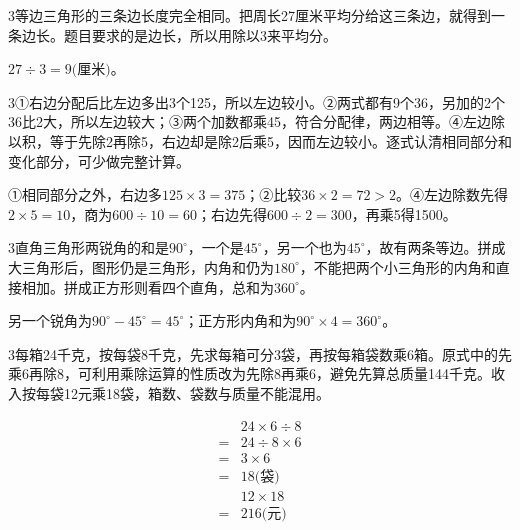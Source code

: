 \documentclass[multi=snippet,border={5bp 20bp 5bp 5bp}]{standalone}
\newenvironment{snippet}[3]{\begin{minipage}{#1bp}\color{answerred}\fontsize{#2}{#3}\selectfont\raggedright}{\end{minipage}}
\begin{document}
\begin{snippet}{505}{11.5}{14}\begin{multicols}{3}\raggedcolumns 等边三角形的三条边长度完全相同。把周长27厘米平均分给这三条边，就得到一条边长。题目要求的是边长，所以用除以3来平均分。\par \(27\div3=9\text{(厘米)}\)\allowbreak 。\end{multicols}\end{snippet}
\begin{snippet}{505}{11.5}{14}\begin{multicols}{3}\raggedcolumns ①右边分配后比左边多出3个125，所以左边较小。②两式都有9个36，另加的2个36比2大，所以左边较大；③两个加数都乘45，符合分配律，两边相等。④左边除以积，等于先除2再除5，右边却是除2后乘5，因而左边较小。逐式认清相同部分和变化部分，可少做完整计算。\par ①相同部分之外，右边多\(125\times3=375\)\allowbreak ；②比较\(36\times2=72>2\)\allowbreak 。④左边除数先得\(2\times5=10\)\allowbreak ，商为\(600\div10=60\)\allowbreak ；右边先得\(600\div2=300\)\allowbreak ，再乘5得1500。\end{multicols}\end{snippet}
\begin{snippet}{505}{11.5}{14}\begin{multicols}{3}\raggedcolumns 直角三角形两锐角的和是\(90^\circ\)\allowbreak ，一个是\(45^\circ\)\allowbreak ，另一个也为\(45^\circ\)\allowbreak ，故有两条等边。拼成大三角形后，图形仍是三角形，内角和仍为\(180^\circ\)\allowbreak ，不能把两个小三角形的内角和直接相加。拼成正方形则看四个直角，总和为\(360^\circ\)\allowbreak 。\par 另一个锐角为\(90^\circ-45^\circ=45^\circ\)\allowbreak ；正方形内角和为\(90^\circ\times4=360^\circ\)\allowbreak 。\end{multicols}\end{snippet}
\begin{snippet}{505}{11.5}{14}\begin{multicols}{3}\raggedcolumns 每箱24千克，按每袋8千克，先求每箱可分3袋，再按每箱袋数乘6箱。原式中的先乘6再除8，可利用乘除运算的性质改为先除8再乘6，避免先算总质量144千克。收入按每袋12元乘18袋，箱数、袋数与质量不能混用。\par \[\begin{aligned}&24\times6\div8\\={}&24\div8\times6\\={}&3\times6\\={}&18\text{(袋)}\\&12\times18\\={}&216\text{(元)}\end{aligned}\]\end{multicols}\end{snippet}
\end{document}
